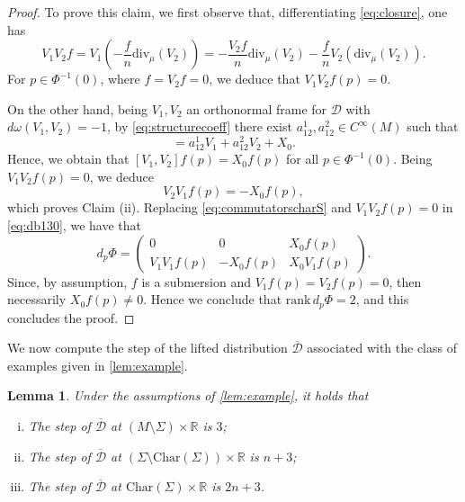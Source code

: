 \documentclass{amsart}
\theoremstyle{plain}
\newtheorem{lemma}[theorem]{Lemma}
\theoremstyle{definition}
\theoremstyle{remark}
\newcommand{\blue}{\color{blue}}
\newcommand{\R}{\mathbb{R}}
\newcommand{\diff}{d}%
\newcommand{\distr}{\mathcal{D}}								%
\newcommand{\lift}[1]{\overline{#1}} 							%
\begin{document}
\begin{proof}
\smallskip
To prove this claim, we first observe that,
differentiating \eqref{eq:closure}, one has
\begin{equation}
\label{eq:V_1V_2f}
V_1 V_2 f =  V_1 \left(-\frac{f}{n}\mathrm{div}_{\mu}(V_2)\right)=-\frac{V_2f}{n}\mathrm{div}_{\mu}(V_2)-\frac{f}{n}V_2\left(\mathrm{div}_{\mu}(V_2)\right).
\end{equation}
For $p\in  \Phi^{-1}(0)$, where $f=V_{2}f=0$, we deduce that $V_1V_2f(p)=0$.

On the other hand, being $V_1,V_2$ an orthonormal frame for $\distr$ with $\diff\omega(V_1,V_2)=-1$, by \eqref{eq:structurecoeff} there exist $a^1_{12},a^2_{12}\in C^\infty(M)$ such that 
\begin{equation}
[V_1,V_2]=a^1_{12}V_1+a^2_{12}V_2+X_0.
\end{equation}
Hence, we obtain that $[V_1,V_2]f(p)=X_0f(p)$ for all $p\in   \Phi^{-1}(0)$. 
Being $V_1V_2f(p)=0$, we deduce
\begin{equation}
\label{eq:commutatorscharS}
V_2V_1f(p)= -X_0f(p),%
\end{equation} 
which proves Claim (ii). Replacing \eqref{eq:commutatorscharS} and $V_1V_2f(p)=0$ in  \eqref{eq:db130}, we have that
\begin{equation}
\diff_p \Phi =
\left( \begin{array}{ccc}
0 & 0 &X_0f(p) \\
V_1V_1f(p) &   -X_0f(p)%
& X_0 V_1f(p)
\end{array} \right).
\end{equation}
Since, by assumption, $f$ is a submersion and $V_1f(p)=V_2f(p)=0$, then necessarily $X_0f(p)\neq 0$. Hence we conclude that $\mathrm{rank}\, \diff _p \Phi =2$, and this concludes the proof.
\end{proof}

We now compute the step of the lifted distribution $\lift\distr$ associated with the class of examples given in \cref{lem:example}.

\begin{lemma}
\label{lem:examplestep}
Under the  assumptions of \cref{lem:example}, it holds that 
\begin{enumerate}[(i)]
\item \label{item:3} The step of $\lift\distr$ at $(M \setminus \Sigma)\times \R$  is $3$;
\item \label{item:n+3} The step of $\lift\distr$ at $(\Sigma \setminus{ \mathrm{Char}(\Sigma)})\times\R$ is $n+3$;
\item \label{item:2n+3} The step of $\lift\distr$ at $ \mathrm{Char}(\Sigma)\times \R$ is $2n+3$.
\end{enumerate}
\end{lemma}
\end{document}
